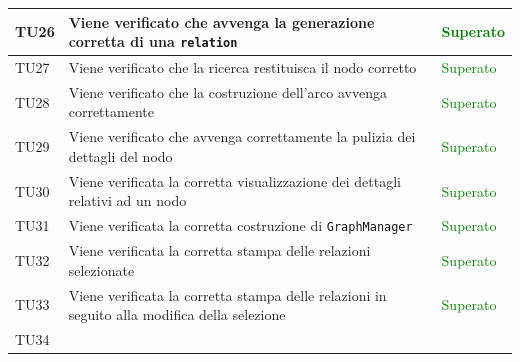 \documentclass[openany,12pt,a4paper]{report}
\begin{document}
\begin{longtable}[c]{| p{2.5cm} |p{8cm} | p{2.5cm} |}
	\\[1em]
	\hline
	\newline TU26&
	\newline Viene verificato che avvenga la generazione corretta di una \verb|relation|&
	\newline \textcolor{green}{Superato}
	\\[1em]
	\hline
	\newline TU27&
	\newline Viene verificato che la ricerca restituisca il nodo corretto&
	\newline \textcolor{green}{Superato}
	\\[1em]
	\hline
	\newline TU28&
	\newline Viene verificato che la costruzione dell'arco avvenga correttamente&
	\newline \textcolor{green}{Superato}
	\\[1em]
	\hline
	\newline TU29&
	\newline Viene verificato che avvenga correttamente la pulizia dei dettagli del nodo&
	\newline \textcolor{green}{Superato}
	\\[1em]
	\hline
	\newline TU30&
	\newline Viene verificata la corretta visualizzazione dei dettagli relativi ad un nodo&
	\newline \textcolor{green}{Superato}
	\\[1em]
	\hline
	\newline TU31&
	\newline Viene verificata la corretta costruzione di \verb|GraphManager|&
	\newline \textcolor{green}{Superato}
	\\[1em]
	\hline
	\newline TU32&
	\newline Viene verificata la corretta stampa delle relazioni selezionate&
	\newline \textcolor{green}{Superato}
	\\[1em]
	\hline
	\newline TU33&
	\newline Viene verificata la corretta stampa delle relazioni in seguito alla modifica della selezione&
	\newline \textcolor{green}{Superato}
	\\[1em]
	\hline
	\newline TU34&

\end{longtable}
\end{document}
